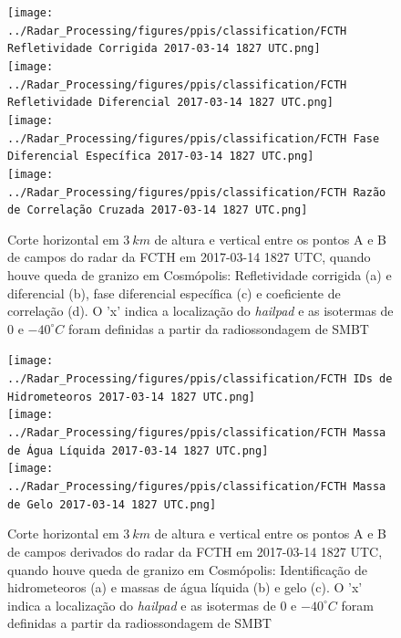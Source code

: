 \begin{figure}[hp]
	\centering
	\caption{Corte horizontal em $3\:km$ de altura e vertical entre os pontos A e B de campos do radar da FCTH em 2017-03-14 1827 UTC, quando houve queda de granizo em Cosmópolis: Refletividade corrigida (a) e diferencial (b), fase diferencial específica (c) e coeficiente de correlação (d). O 'x' indica a localização do \textit{hailpad} e as isotermas de $0$ e $-40^{\circ}C$ foram definidas a partir da radiossondagem de SMBT}
	\label{radar_20170314_1}
	\vspace{-5pt}
	\texttt{[image: ../Radar\_Processing/figures/ppis/classification/FCTH Refletividade Corrigida 2017-03-14 1827 UTC.png]} \\
	\vspace{-5pt}
	\texttt{[image: ../Radar\_Processing/figures/ppis/classification/FCTH Refletividade Diferencial 2017-03-14 1827 UTC.png]} \\
	\vspace{-5pt}
	\texttt{[image: ../Radar\_Processing/figures/ppis/classification/FCTH Fase Diferencial Específica 2017-03-14 1827 UTC.png]} \\
	\vspace{-5pt}
	\texttt{[image: ../Radar\_Processing/figures/ppis/classification/FCTH Razão de Correlação Cruzada 2017-03-14 1827 UTC.png]} \\
\end{figure}

\begin{figure}[hp]
	\centering
	\caption{Corte horizontal em $3\:km$ de altura e vertical entre os pontos A e B de campos derivados do radar da FCTH em 2017-03-14 1827 UTC, quando houve queda de granizo em Cosmópolis: Identificação de hidrometeoros (a) e massas de água líquida (b) e gelo (c). O 'x' indica a localização do \textit{hailpad} e as isotermas de $0$ e $-40^{\circ}C$ foram definidas a partir da radiossondagem de SMBT} 
	\label{radar_derived_20170314_1}
	\vspace{-5pt}
	\texttt{[image: ../Radar\_Processing/figures/ppis/classification/FCTH IDs de Hidrometeoros 2017-03-14 1827 UTC.png]} \\
	\vspace{-5pt}
	\texttt{[image: ../Radar\_Processing/figures/ppis/classification/FCTH Massa de Água Líquida 2017-03-14 1827 UTC.png]} \\
	\vspace{-5pt}
	\texttt{[image: ../Radar\_Processing/figures/ppis/classification/FCTH Massa de Gelo 2017-03-14 1827 UTC.png]} \\
\end{figure}

